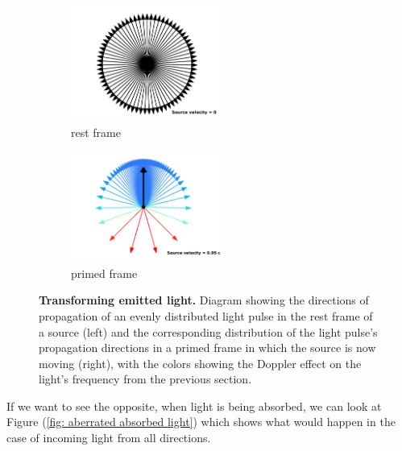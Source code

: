 \begin{figure}[H]
	\begin{subfigure}{.49\textwidth}
		\centering
		\includegraphics[width = 5cm]{images/pdf/Aberrated_velocities_restframe.pdf}
		\caption{rest frame}
	\end{subfigure}
	\begin{subfigure}{.49\textwidth}
		\centering
		\includegraphics[width = 5cm]{images/pdf/Aberrated_velocities.pdf}
		\caption{primed frame}
	\end{subfigure}
	\caption{\textbf{Transforming emitted light.} Diagram showing the directions of propagation of an evenly distributed light pulse in the rest frame of a source (left) and the corresponding distribution of the light pulse's propagation directions in a primed frame in which the source is now moving (right), with the colors showing the Doppler effect on the light's frequency from the previous section.}
	\label{fig: aberrated emitted light}
\end{figure}



If we want to see the opposite, when light is being absorbed, we can look at Figure (\ref{fig: aberrated absorbed light}) which shows what would happen in the case of incoming light from all directions.

